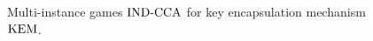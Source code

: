 \begin{figure}[!ht]
    \centering
    \nicoresetlinenr%
    \fbox{%
        \scalebox{\codescalefactor}{%
        }%
    }
    \caption{%
        Multi-instance games ${\mathrm{IND}\text{-}\mathrm{CCA}}$ for key encapsulation mechanism~$\mathrm{KEM}$.
    }
    \label{fig:kem:ind:mi:corrupt}
\end{figure}